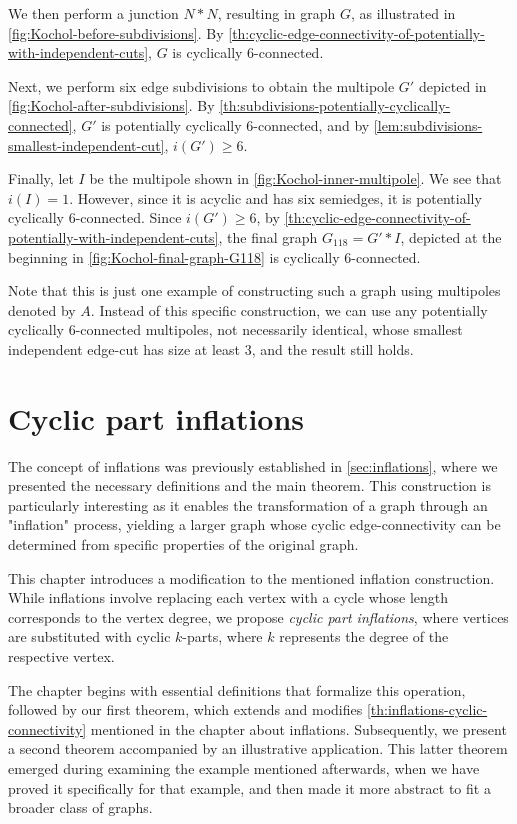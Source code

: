 \documentclass[12pt, twoside]{book}
\begin{document}
\begin{example}
	We then perform a junction $N*N$, resulting in graph $G$, as illustrated in \cref{fig:Kochol-before-subdivisions}. By \cref{th:cyclic-edge-connectivity-of-potentially-with-independent-cuts}, $G$ is cyclically 6-connected.
	
	Next, we perform six edge subdivisions to obtain the multipole $G'$ depicted in \cref{fig:Kochol-after-subdivisions}. By \cref{th:subdivisions-potentially-cyclically-connected}, $G'$ is potentially cyclically 6-connected, and by \cref{lem:subdivisions-smallest-independent-cut}, $i(G')\geq 6$.
	
	Finally, let $I$ be the multipole shown in \cref{fig:Kochol-inner-multipole}. We see that $i(I)=1$. However, since it is acyclic and has six semiedges, it is potentially cyclically 6-connected. Since $i(G')\geq 6$, by \cref{th:cyclic-edge-connectivity-of-potentially-with-independent-cuts}, the final graph $G_{118}=G'*I$, depicted at the beginning in \cref{fig:Kochol-final-graph-G118} is cyclically 6-connected.
	
	Note that this is just one example of constructing such a graph using multipoles denoted by $A$. Instead of this specific construction, we can use any potentially cyclically 6-connected multipoles, not necessarily identical, whose smallest independent edge-cut has size at least 3, and the result still holds.
\end{example}

\chapter{Cyclic part inflations}\label{ch:cyclic-part-inflations}

The concept of inflations was previously established in \cref{sec:inflations}, where we presented the necessary definitions and the main theorem. This construction is particularly interesting as it enables the transformation of a graph through an "inflation" process, yielding a larger graph whose cyclic edge-connectivity can be determined from specific properties of the original graph.

This chapter introduces a modification to the mentioned inflation construction. While inflations involve replacing each vertex with a cycle whose length corresponds to the vertex degree, we propose \textit{cyclic part inflations}, where vertices are substituted with cyclic $k$-parts, where $k$ represents the degree of the respective vertex.

The chapter begins with essential definitions that formalize this operation, followed by our first theorem, which extends and modifies \cref{th:inflations-cyclic-connectivity} mentioned in the chapter about inflations. Subsequently, we present a second theorem accompanied by an illustrative application. This latter theorem emerged during examining the example mentioned afterwards, when we have proved it specifically for that example, and then made it more abstract to fit a broader class of graphs.
\end{document}
